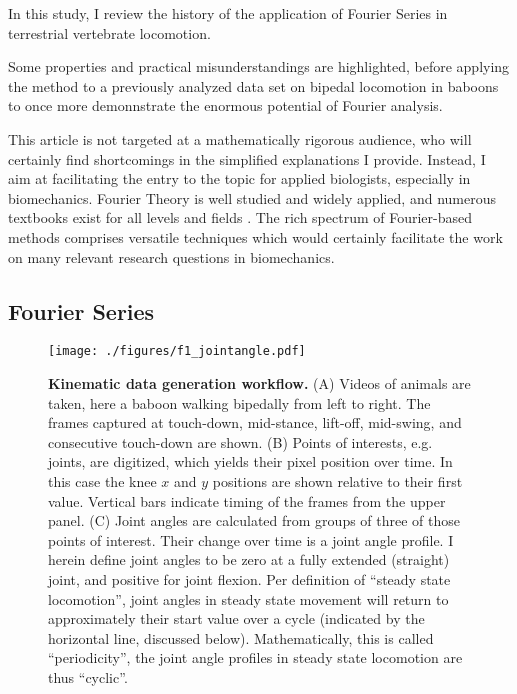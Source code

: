 In this study, I review the history of the application of Fourier Series in terrestrial vertebrate locomotion.

Some properties and practical misunderstandings are highlighted, before applying the method to a previously analyzed data set on bipedal locomotion in baboons \citep{Druelle2021} to once more demonnstrate the enormous potential of Fourier analysis.

This article is not targeted at a mathematically rigorous audience, who will certainly find shortcomings in the simplified explanations I provide.
Instead, I aim at facilitating the entry to the topic for applied biologists, especially in biomechanics.
Fourier Theory is well studied and widely applied, and numerous textbooks exist for all levels and fields \citep[\textit{cf.}][]{Bracewell2000,Osgood2019}.
The rich spectrum of Fourier-based methods comprises versatile techniques which would certainly facilitate the work on many relevant research questions in biomechanics.


\subsection{Fourier Series}
\label{sec:org4351561}

\begin{figure}[pt]
\centering
\texttt{[image: ./figures/f1\_jointangle.pdf]}
\caption{\label{fig:jointangle}\textbf{Kinematic data generation workflow.} (A) Videos of animals are taken, here a baboon walking bipedally from left to right. The frames captured at touch-down, mid-stance, lift-off, mid-swing, and consecutive touch-down are shown. (B) Points of interests, e.g. joints, are digitized, which yields their pixel position over time. In this case the knee \(x\) and \(y\) positions are shown relative to their first value. Vertical bars indicate timing of the frames from the upper panel. (C) Joint angles are calculated from groups of three of those points of interest. Their change over time is a joint angle profile. I herein define joint angles to be zero at a fully extended (straight) joint, and positive for joint flexion. Per definition of ``steady state locomotion'', joint angles in steady state movement will return to approximately their start value over a cycle (indicated by the horizontal line, discussed below). Mathematically, this is called ``periodicity'', the joint angle profiles in steady state locomotion are thus ``cyclic''.}
\end{figure}

